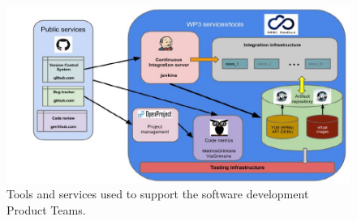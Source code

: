 \documentclass{article}
\begin{document}
\begin{figure}
  \centering
  \includegraphics[width=\textwidth]{./figs/Figure7.pdf}
  \caption{Tools and services used to support the software development Product Teams.}
  \label{fig:7}
\end{figure}
\end{document}
